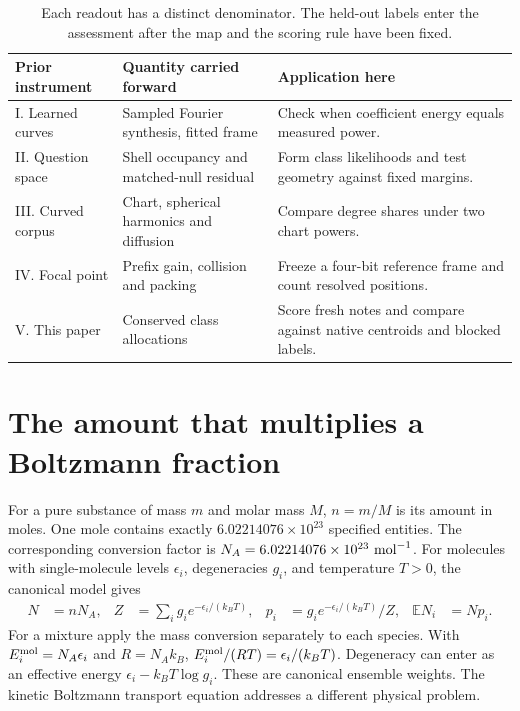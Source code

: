 \documentclass[11pt,a4paper]{article}
\newcommand{\E}{\mathbb E}
\begin{document}
\begin{table}[ht]
\centering\small
\begin{tabular}{@{}p{.19\linewidth}p{.32\linewidth}p{.39\linewidth}@{}}
\toprule
Prior instrument & Quantity carried forward & Application here\\ \midrule
I. Learned curves & Sampled Fourier synthesis, fitted frame & Check when coefficient energy equals measured power.\\
II. Question space & Shell occupancy and matched-null residual & Form class likelihoods and test geometry against fixed margins.\\
III. Curved corpus & Chart, spherical harmonics and diffusion & Compare degree shares under two chart powers.\\
IV. Focal point & Prefix gain, collision and packing & Freeze a four-bit reference frame and count resolved positions.\\
V. This paper & Conserved class allocations & Score fresh notes and compare against native centroids and blocked labels.\\
\bottomrule
\end{tabular}
\caption{Each readout has a distinct denominator. The held-out labels enter the assessment after the map and the scoring rule have been fixed.}
\end{table}

\section{The amount that multiplies a Boltzmann fraction}
For a pure substance of mass $m$ and molar mass $M$, $n=m/M$ is its amount in moles. One mole contains exactly $6.02214076\times10^{23}$ specified entities. The corresponding conversion factor is $N_A=6.02214076\times10^{23}\ {\rm mol}^{-1}$. For molecules with single-molecule levels $\epsilon_i$, degeneracies $g_i$, and temperature $T>0$, the canonical model gives \citep{si,tong}
\begin{align}
 N&=nN_A,& Z&=\sum_i g_i e^{-\epsilon_i/(k_BT)},&
 p_i&=g_i e^{-\epsilon_i/(k_BT)}/Z,& \E N_i&=Np_i.\label{eq:mole}
\end{align}
For a mixture apply the mass conversion separately to each species. With $E_i^{\rm mol}=N_A\epsilon_i$ and $R=N_A k_B$, $E_i^{\rm mol}/(RT)=\epsilon_i/(k_BT)$. Degeneracy can enter as an effective energy $\epsilon_i-k_BT\log g_i$. These are canonical ensemble weights. The kinetic Boltzmann transport equation addresses a different physical problem.
\end{document}
